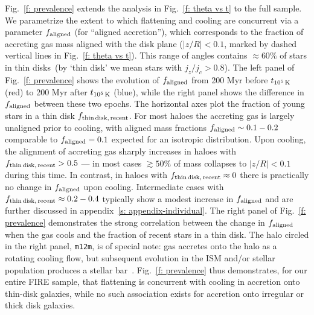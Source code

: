 \documentclass[fleqn,usenatbib]{mnras}
\newcommand{\fthin}{f_{\rm thin\,disk,\,recent}}
\newcommand{\tcools}{t_{10^5\,{\rm K}}}
\begin{document}
Fig.~\ref{f: prevalence} extends the analysis in Fig.~\ref{f: theta vs t} to the full sample.
We parametrize the extent to which flattening and cooling are concurrent via a parameter $f_{\rm aligned}$ (for ``aligned accretion''), which corresponds to the fraction of accreting gas mass aligned with the disk plane ($\vert z/R \vert < 0.1$, marked by dashed vertical lines in Fig.~\ref{f: theta vs t}).
This range of angles contains $\approx 60\%$ of stars in thin disks~(by `thin disk' we mean stars with $j_z/j_c > 0.8$).
The left panel of Fig.~\ref{f: prevalence} shows the evolution of $f_{\rm aligned}$ from 200 Myr before $\tcools$ (red) to 200 Myr after $\tcools$ (blue), while the right panel shows the difference in $f_{\rm aligned}$ between these two epochs.
The horizontal axes plot the fraction of young stars in a thin disk $\fthin$. 
For most haloes the accreting gas is largely unaligned prior to cooling, with aligned mass fractions $f_{\rm aligned}\sim 0.1 - 0.2$ comparable to $f_{\rm aligned} = 0.1$ expected for an isotropic distribution.
Upon cooling, the alignment of accreting gas sharply increases in haloes with $\fthin > 0.5$ --- in most cases $\gtrsim 50\%$ of mass collapses to $\vert z/R \vert < 0.1$ during this time.
In contrast, in haloes with $\fthin \approx 0$ there is practically no change in $f_{\rm aligned}$ upon cooling.
Intermediate cases with $\fthin \approx 0.2-0.4$ typically show a modest increase in $f_{\rm aligned}$ and are further discussed in appendix~\ref{s: appendix-individual}.
The right panel of Fig.~\ref{f: prevalence} demonstrates the strong correlation between the change in $f_{\rm aligned}$ when the gas cools and the fraction of recent stars in a thin disk. The halo circled in the right panel, \texttt{m12m}, is of special note:
gas accretes onto the halo as a rotating cooling flow, but subsequent evolution in the ISM and/or stellar population produces a stellar bar~\citep{Debattista2019}.
Fig.~\ref{f: prevalence} thus demonstrates, for our entire FIRE sample, that flattening is concurrent with cooling in accretion onto thin-disk galaxies, while no such association exists for accretion onto irregular or thick disk galaxies.
\end{document}
